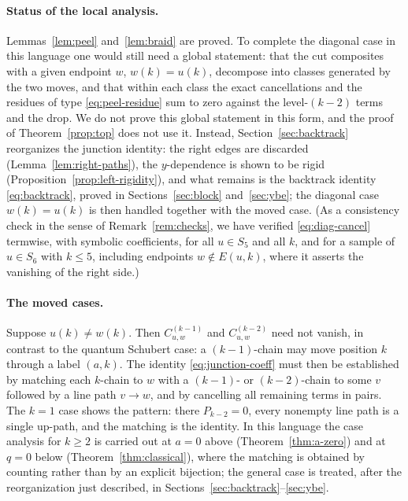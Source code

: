 \documentclass[11pt]{article}
\begin{document}
\paragraph{Status of the local analysis.}
Lemmas~\ref{lem:peel} and~\ref{lem:braid} are proved. To complete the
diagonal case in this language one would still need a global
statement: that the cut composites with a given endpoint $w$,
$w(k)=u(k)$, decompose into classes generated by the two moves, and
that within each class the exact cancellations and the residues of
type \eqref{eq:peel-residue} sum to zero against the level-$(k-2)$
terms and the drop. We do not prove this global statement in this
form, and the proof of Theorem~\ref{prop:top} does not use it.
Instead, Section~\ref{sec:backtrack} reorganizes the junction
identity: the right edges are discarded
(Lemma~\ref{lem:right-paths}), the $y$-dependence is shown to be
rigid (Proposition~\ref{prop:left-rigidity}), and what remains is
the backtrack identity \eqref{eq:backtrack}, proved in
Sections~\ref{sec:block} and~\ref{sec:ybe}; the diagonal case
$w(k)=u(k)$ is then handled together with the moved case. (As a
consistency check in the sense of Remark~\ref{rem:checks}, we have
verified \eqref{eq:diag-cancel} termwise, with symbolic coefficients,
for all $u\in S_5$ and all $k$, and for a sample of $u\in S_6$ with
$k\leq5$, including endpoints $w\notin E(u,k)$, where it asserts the
vanishing of the right side.)

\paragraph{The moved cases.}
Suppose $u(k)\neq w(k)$. Then $C^{(k-1)}_{u,w}$ and
$C^{(k-2)}_{u,w}$ need not vanish, in contrast to the quantum
Schubert case: a $(k-1)$-chain may move position $k$ through a label
$(a,k)$. The identity \eqref{eq:junction-coeff} must then be
established by matching each $k$-chain to $w$ with a $(k-1)$- or
$(k-2)$-chain to some $v$ followed by a line path $v\to w$, and by
cancelling all remaining terms in pairs. The $k=1$ case shows the
pattern: there $P_{k-2}=0$, every nonempty line path is a single
up-path, and the matching is the identity. In this language the case
analysis for $k\geq2$ is carried out at $a=0$ above
(Theorem~\ref{thm:a-zero}) and at $q=0$ below
(Theorem~\ref{thm:classical}), where the matching is obtained by
counting rather than by an explicit bijection; the general case is
treated, after the reorganization just described, in
Sections~\ref{sec:backtrack}--\ref{sec:ybe}.
\end{document}
